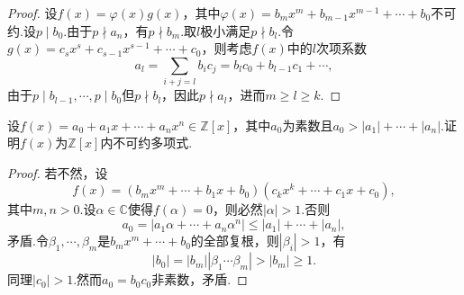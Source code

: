 \begin{proof}
	设$f(x)=\varphi(x)g(x)$，其中$\varphi(x)=b_mx^m+b_{m-1}x^{m-1}+\cdots+b_0$不可约.设$p\mid b_0$.由于$p\nmid a_n$，有$p\nmid b_m$.取$l$极小满足$p\nmid b_l$.令$g(x)=c_sx^s+c_{s-1}x^{s-1}+\cdots+c_0$，则考虑$f(x)$中的$l$次项系数
	\[
		a_l=\sum_{i+j=l}b_ic_j=b_lc_0+b_{l-1}c_1+\cdots,
	\]
	由于$p\mid b_{l-1},\cdots,p\mid b_0$但$p\nmid b_l$，因此$p\nmid a_l$，进而$m\ge l\ge k$.
\end{proof}
\begin{prob}[10]
	设$f(x)=a_0+a_1x+\cdots+a_nx^n\in\mathbb{Z}[x]$，其中$a_0$为素数且$a_0>|a_1|+\cdots+|a_n|$.证明$f(x)$为$\mathbb{Z}[x]$内不可约多项式.
\end{prob}
\begin{proof}
	若不然，设
	\[
		f(x)=(b_mx^m+\cdots+b_1x+b_0)(c_kx^k+\cdots+c_1x+c_0),
	\]
	其中$m,n>0$.设$\alpha\in\mathbb{C}$使得$f(\alpha)=0$，则必然$|\alpha|>1$.否则
	\[
		a_0=|a_1\alpha+\cdots+a_n\alpha^n|\le|a_1|+\cdots+|a_n|,
	\]
	矛盾.令$\beta_1,\cdots,\beta_m$是$b_mx^m+\cdots+b_0$的全部复根，则$|\beta_i|>1$，有
	\[
		|b_0|=|b_m||\beta_1\cdots\beta_m|>|b_m|\ge 1.
	\]
	同理$|c_0|>1$.然而$a_0=b_0c_0$非素数，矛盾.
\end{proof}
